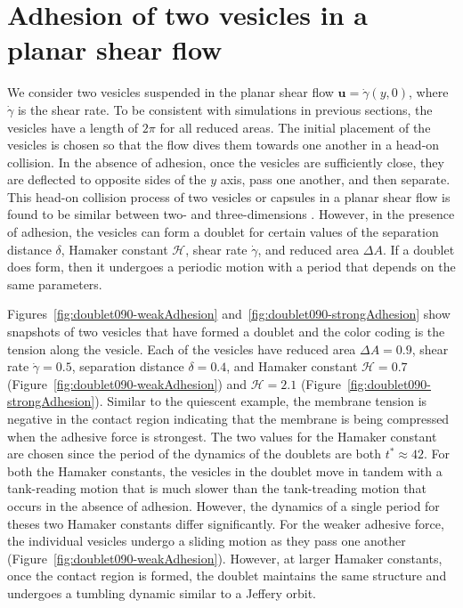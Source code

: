 \documentclass[prf,superscriptaddress,showkeys,longbibliography]{revtex4-1}
\newcommand{\uu}{\mathbf{u}}
\begin{document}
\section{Adhesion of two vesicles in a planar shear flow}
\label{sec:sflow} 
We consider two vesicles suspended in the planar shear flow $\uu =
\dot\gamma(y,0)$, where $\dot\gamma$ is the shear rate.  To be
consistent with simulations in previous sections, the vesicles have a
length of $2\pi$ for all reduced areas.  The initial placement of the
vesicles is chosen so that the flow dives them towards one another in a
head-on collision.  In the absence of adhesion, once the vesicles are
sufficiently close, they are deflected to opposite sides of the $y$
axis, pass one another, and then separate. This head-on collision process of two vesicles or capsules in a planar shear flow
is found to be similar between two- \cite{Breyiannis-Pozrikidis:2000,RahimianVeerapaneniBiros2010_JCP} and three-dimensions \cite{LacMorelBarthes-Biesel2007_JFM,LacBarthes-Biesel2008_PoF,OmoriIshikawaImaiYamaguchi2013_JBiomechics,RahimianVeerapaneniZorinBiros2015_JCP}.  However, in the presence of
adhesion, the vesicles can form a doublet for certain values of the
separation distance $\delta$, Hamaker constant $\mathcal{H}$, shear rate
$\dot\gamma$, and reduced area $\Delta A$.  If a doublet does form, then
it undergoes a periodic motion with a period that depends on the same
parameters.

Figures~\ref{fig:doublet090-weakAdhesion}
and~\ref{fig:doublet090-strongAdhesion} show snapshots of two vesicles
that have formed a doublet and the color coding is the tension along the
vesicle.  Each of the vesicles have reduced area $\Delta A = 0.9$, shear
rate $\dot\gamma = 0.5$, separation distance $\delta = 0.4$, and Hamaker
constant $\mathcal{H} = 0.7$ (Figure~\ref{fig:doublet090-weakAdhesion})
and $\mathcal{H} = 2.1$ (Figure~\ref{fig:doublet090-strongAdhesion}).
Similar to the quiescent example, the membrane tension is negative in
the contact region indicating that the membrane is being compressed when
the adhesive force is strongest.  The two values for the Hamaker
constant are chosen since the period of the dynamics of the doublets are
both $t^* \approx 42$.  For both the Hamaker constants, the vesicles in
the doublet move in tandem with a tank-reading motion that is much
slower than the tank-treading motion that occurs in the absence of
adhesion.  However, the dynamics of a single period for theses two
Hamaker constants differ significantly.  For the weaker adhesive force,
the individual vesicles undergo a sliding motion as they pass one
another (Figure~\ref{fig:doublet090-weakAdhesion}).  However, at larger
Hamaker constants, once the contact region is formed, the doublet
maintains the same structure and undergoes a tumbling dynamic similar to
a Jeffery orbit.
\end{document}
